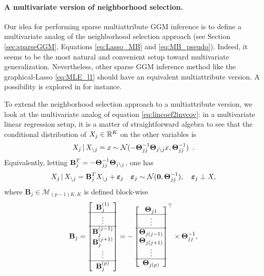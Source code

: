 \paragraph*{A multivariate version of neighborhood selection.}  Our
idea for performing sparse multiattribute GGM inference is to define
a multivariate analog of the neighborhood selection approach
\cite{2006_AS_Meinshausen} (see Section \ref{sec:sparseGGM}, Equations
\eqref{eq:Lasso_MB} and \eqref{eq:MB_pseudo}). Indeed, it seems to be
the most natural and convenient setup toward multivariate
generalization.  Nevertheless, other sparse GGM inference method like
the graphical-Lasso \eqref{eq:MLE_l1} should have an equivalent
multiattribute version. A possibility is explored in
\cite{kolar2014graph} for instance.

To extend the neighborhood selection approach to a multiattribute
version, we look at the multivariate analog of equation
\eqref{eq:lincoef2invcov}: in a multivariate linear regression setup,
it is a matter of straightforward algebra to see that the conditional
distribution of $X_j\in\mathbb{R}^K$ on the other variables is
\begin{equation*}
  X_j \, |\,  X_{\backslash j}  = x \sim  \mathcal{N}(- \boldsymbol\Theta_{jj}^{-1}\boldsymbol\Theta_{j
    \backslash j} x , \boldsymbol\Theta_{jj}^{-1})\enskip.
\end{equation*} 
Equivalently,     letting      $\displaystyle     \mathbf{B}_j^T     =
-\boldsymbol\Theta_{jj}^{-1} \boldsymbol\Theta_{j\backslash j}$, one has
\begin{equation*}
  X_j \, |\, X_{\backslash j} = \mathbf{B}_j^T X_{\backslash j} +
  \boldsymbol\varepsilon_j \quad \boldsymbol\varepsilon_j
  \sim \mathcal{N}(\mathbf{0},\boldsymbol\Theta_{jj}^{-1}), \quad \boldsymbol\varepsilon_j \perp X,
\end{equation*}
where $\mathbf{B}_j\in\mathcal{M}_{(p-1)K,K}$ is defined block-wise
\begin{equation*}
  \mathbf{B}_j = \begin{bmatrix}
    \mathbf{B}_j^{(1)} \\ \hline
    \vdots \\ \hline
    \mathbf{B}_j^{(j-1)} \\ 
    \mathbf{B}_j^{(j+1)} \\ 
    \vdots \\ \hline
    \mathbf{B}_j^{(p)} \\ 
  \end{bmatrix} = - \begin{bmatrix}
    \boldsymbol\Theta_{j1} \\ \hline
    \vdots \\ \hline
    \boldsymbol\Theta_{j(j-1)} \\ 
    \boldsymbol\Theta_{j(j+1)} \\ 
    \vdots \\ \hline
    \boldsymbol\Theta_{j(p)} \\ 
  \end{bmatrix}^\top \times \boldsymbol\Theta_{jj}^{-1},
\end{equation*}
